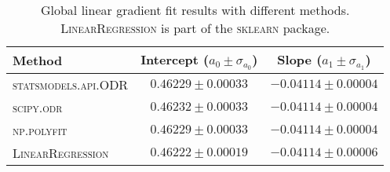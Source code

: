 
\begin{table}
\caption{Global linear gradient fit results with different methods. \textsc{LinearRegression} is part of the \textsc{sklearn} package.}
\label{tab:global_fit_results_per_method}
\begin{tabularx}{\columnwidth}{lCC}
\hline
Method & Intercept ($a_0 \pm \sigma_{a_0}$) & Slope ($a_1 \pm \sigma_{a_1}$) \\
\hline
\textsc{statsmodels.api.ODR} & $0.46229 \pm 0.00033$ & $-0.04114 \pm 0.00004$ \\
\textsc{scipy.odr} & $0.46232 \pm 0.00033$ & $-0.04114 \pm 0.00004$ \\
\textsc{np.polyfit} & $0.46229 \pm 0.00033$ & $-0.04114 \pm 0.00004$ \\
\textsc{LinearRegression} & $0.46222 \pm 0.00019$ & $-0.04114 \pm 0.00006$ \\
\hline
\end{tabularx}
\end{table}
